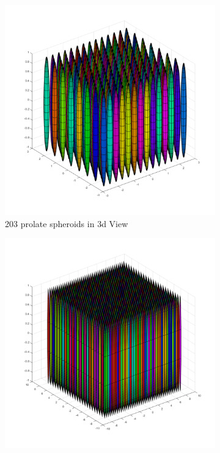 \begin{figure}[!ht]
        \centering
        \begin{subfigure}[b]{0.475\textwidth}
            \centering
            \includegraphics[width=\textwidth]{Images/Rods/SmallRods3d.pdf}
            \caption[]%
            {{\small 203 prolate spheroids in 3d View}}    
            \label{fig:mean and std of net14}
        \end{subfigure}
        \hfill
        \begin{subfigure}[b]{0.475\textwidth}  
            \centering 
            \includegraphics[width=\textwidth]{Images/Rods/LargeRods3d.pdf}

\end{subfigure}
\end{figure}
